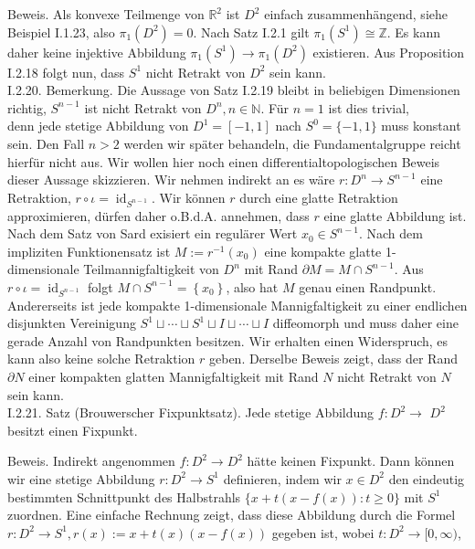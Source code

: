\documentclass[10pt, letterpaper]{article}
\begin{document}
Beweis. Als konvexe Teilmenge von $\mathbb{R}^{2}$ ist $D^{2}$ einfach zusammenhängend, siehe Beispiel I.1.23, also $\pi_{1}\left(D^{2}\right)=0$. Nach Satz I.2.1 gilt $\pi_{1}\left(S^{1}\right) \cong \mathbb{Z}$. Es kann daher keine injektive Abbildung $\pi_{1}\left(S^{1}\right) \rightarrow \pi_{1}\left(D^{2}\right)$ existieren. Aus Proposition I.2.18 folgt nun, dass $S^{1}$ nicht Retrakt von $D^{2}$ sein kann.\\
I.2.20. Bemerkung. Die Aussage von Satz I.2.19 bleibt in beliebigen Dimensionen richtig, $S^{n-1}$ ist nicht Retrakt von $D^{n}, n \in \mathbb{N}$. Für $n=1$ ist dies trivial,\\
denn jede stetige Abbildung von $D^{1}=[-1,1]$ nach $S^{0}=\{-1,1\}$ muss konstant sein. Den Fall $n>2$ werden wir später behandeln, die Fundamentalgruppe reicht hierfür nicht aus. Wir wollen hier noch einen differentialtopologischen Beweis dieser Aussage skizzieren. Wir nehmen indirekt an es wäre $r: D^{n} \rightarrow S^{n-1}$ eine Retraktion, $r \circ \iota=\operatorname{id}_{S^{n-1}}$. Wir können $r$ durch eine glatte Retraktion approximieren, dürfen daher o.B.d.A. annehmen, dass $r$ eine glatte Abbildung ist. Nach dem Satz von Sard exisiert ein regulärer Wert $x_{0} \in S^{n-1}$. Nach dem impliziten Funktionensatz ist $M:=r^{-1}\left(x_{0}\right)$ eine kompakte glatte 1-dimensionale Teilmannigfaltigkeit von $D^{n}$ mit Rand $\partial M=M \cap S^{n-1}$. Aus $r \circ \iota=\operatorname{id}_{S^{n-1}}$ folgt $M \cap S^{n-1}=\left\{x_{0}\right\}$, also hat $M$ genau einen Randpunkt. Andererseits ist jede kompakte 1-dimensionale Mannigfaltigkeit zu einer endlichen disjunkten Vereinigung $S^{1} \sqcup \cdots \sqcup S^{1} \sqcup I \sqcup \cdots \sqcup I$ diffeomorph und muss daher eine gerade Anzahl von Randpunkten besitzen. Wir erhalten einen Widerspruch, es kann also keine solche Retraktion $r$ geben. Derselbe Beweis zeigt, dass der Rand $\partial N$ einer kompakten glatten Mannigfaltigkeit mit Rand $N$ nicht Retrakt von $N$ sein kann.\\
I.2.21. Satz (Brouwerscher Fixpunktsatz). Jede stetige Abbildung $f: D^{2} \rightarrow$ $D^{2}$ besitzt einen Fixpunkt.

Beweis. Indirekt angenommen $f: D^{2} \rightarrow D^{2}$ hätte keinen Fixpunkt. Dann können wir eine stetige Abbildung $r: D^{2} \rightarrow S^{1}$ definieren, indem wir $x \in D^{2}$ den eindeutig bestimmten Schnittpunkt des Halbstrahls $\{x+t(x-f(x)): t \geq 0\}$ mit $S^{1}$ zuordnen. Eine einfache Rechnung zeigt, dass diese Abbildung durch die Formel $r: D^{2} \rightarrow S^{1}, r(x):=x+t(x)(x-f(x))$ gegeben ist, wobei $t: D^{2} \rightarrow[0, \infty)$,
\end{document}
